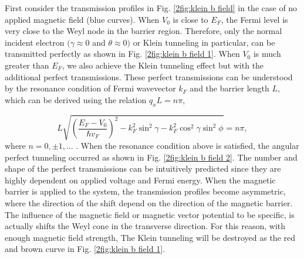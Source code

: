     First consider the transmission profiles in Fig. \ref{2fig:klein b field} in the case of no applied magnetic field (blue curves).
    When $V_0$ is close to $E_F$, the Fermi level is very close to the Weyl node in the barrier region. 
    Therefore, only the normal incident electron $(\gamma \approx 0$ and $\theta \approx 0)$ or Klein tunneling in particular, can be transmitted perfectly as shown in Fig. \ref{2fig:klein b field 1}.
    When $V_0$ is much greater than $E_F$, we also achieve the Klein tunneling effect but with the additional perfect transmissions.
    These perfect transmissions can be understood by the resonance condition of Fermi wavevector $k_F$ and the barrier length $L$, which can be derived using the relation $q_x L = n \pi$,
    
    \begin{equation}\label{2eq:resonance condition}
        L \sqrt{\left(\frac{E_F-V_0}{\hbar v_F}\right)^2-k_F^2 \sin^2{\gamma}-k_F^2 \cos^2{\gamma} \sin^2{\phi}}= n \pi,
    \end{equation}
    where $n = 0, \pm 1,...$ . When the resonance condition above is satisfied, the angular perfect tunneling occurred as shown in Fig. \ref{2fig:klein b field 2}.
    The number and shape of the perfect transmissions can be intuitively predicted since they are highly dependent on applied voltage and Fermi energy.
    When the magnetic barrier is applied to the system, the transmission profiles become asymmetric, where the direction of the shift depend on the direction of the magnetic barrier.
    The influence of the magnetic field or magnetic vector potential to be specific, is actually shifts the Weyl cone in the transverse direction.
    For this reason, with enough magnetic field strength, The Klein tunneling will be destroyed as the red and brown curve in Fig. \ref{2fig:klein b field 1}. 
